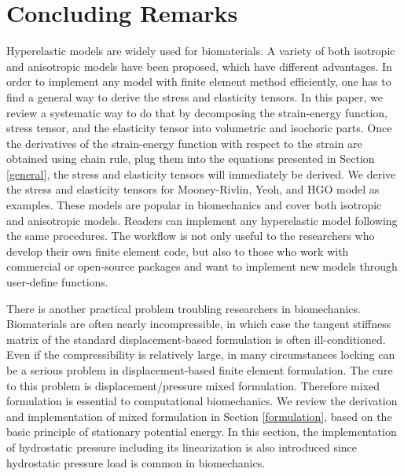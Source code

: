 \section{Concluding Remarks}
Hyperelastic models are widely used for biomaterials. A variety of both isotropic and anisotropic models have been proposed, which have different advantages. In order to implement any model with finite element method efficiently, one has to find a general way to derive the stress and elasticity tensors. In this paper, we review a systematic way to do that by decomposing the strain-energy function, stress tensor, and the elasticity tensor into volumetric and isochoric parts. Once the derivatives of the strain-energy function with respect to the strain are obtained using chain rule, plug them into the equations presented in Section \ref{general}, the stress and elasticity tensors will immediately be derived. We derive the stress and elasticity tensors for Mooney-Rivlin, Yeoh, and HGO model as examples. These models are popular in biomechanics and cover both isotropic and anisotropic models. Readers can implement any hyperelastic model following the same procedures. The workflow is not only useful to the researchers who develop their own finite element code, but also to those who work with commercial or open-source packages and want to implement new models through user-define functions.

There is another practical problem troubling researchers in biomechanics. Biomaterials are often nearly incompressible, in which case the tangent stiffness matrix of the standard displacement-based formulation is often ill-conditioned. Even if the compressibility is relatively large, in many circumstances locking can be a serious problem in displacement-based finite element formulation. The cure to this problem is displacement/pressure mixed formulation. Therefore mixed formulation is essential to computational biomechanics. We review the derivation and implementation of mixed formulation in Section \ref{formulation}, based on the basic principle of stationary potential energy. In this section, the implementation of hydrostatic pressure including its linearization is also introduced since hydrostatic pressure load is common in biomechanics.


